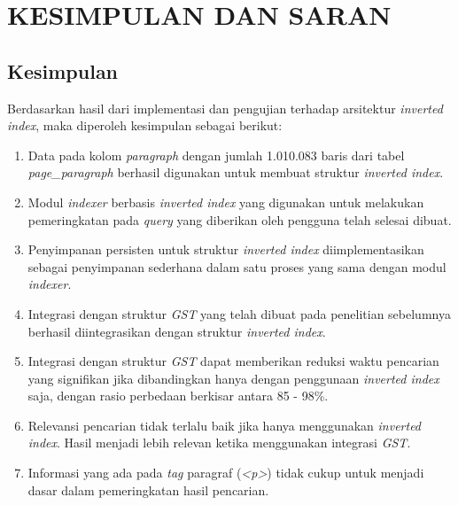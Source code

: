 
\chapter{KESIMPULAN DAN SARAN}

\section{Kesimpulan}

Berdasarkan hasil dari implementasi dan pengujian terhadap arsitektur
\textit{inverted index}, maka diperoleh kesimpulan sebagai berikut:

\begin{enumerate}
	\item{Data pada kolom \textit{paragraph} dengan jumlah 1.010.083 baris dari
		tabel \textit{page\_paragraph} berhasil digunakan untuk membuat struktur
		\textit{inverted index}.}
	\item{Modul \textit{indexer} berbasis \textit{inverted index} yang digunakan
		untuk melakukan pemeringkatan pada \textit{query} yang diberikan oleh 
		pengguna telah selesai dibuat.}
	\item{Penyimpanan persisten untuk struktur \textit{inverted index} 
		diimplementasikan sebagai penyimpanan sederhana dalam satu proses yang sama 
		dengan modul \textit{indexer}.}
	\item{Integrasi dengan struktur \textit{GST} yang telah dibuat pada penelitian 
		sebelumnya berhasil diintegrasikan dengan struktur \textit{inverted index}.}
	\item{Integrasi dengan struktur \textit{GST} dapat memberikan reduksi waktu 
		pencarian yang signifikan jika dibandingkan hanya dengan penggunaan
		\textit{inverted index} saja, dengan rasio perbedaan berkisar antara 85 
		- 98\%.}
	\item{Relevansi pencarian tidak terlalu baik jika hanya menggunakan
		\textit{inverted index}. Hasil menjadi lebih relevan ketika menggunakan 
		integrasi \textit{GST}.}
	\item{Informasi yang ada pada \textit{tag} paragraf (\textit{<p>}) tidak cukup 
		untuk menjadi dasar dalam pemeringkatan hasil pencarian.}
\end{enumerate}

